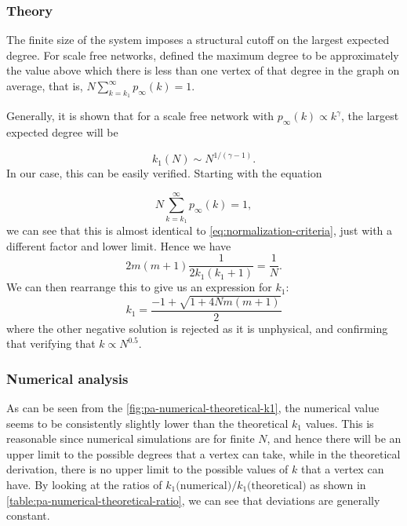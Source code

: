 \subsubsection{Theory}
The finite size of the system imposes a structural cutoff on the largest expected degree. For scale free networks, \citet{Aiello2001a} defined the maximum degree to be approximately the value above which there is less than one vertex of that degree in the graph on average, that is, $N \sum_{k = k_1}^\infty p_\infty(k) = 1$. 

Generally, it is shown \citep{Boguna2004} that for a scale free network with $p_{\infty}(k) \propto k^{\gamma}$, the largest expected degree will be

\begin{equation}
	k_1(N) \sim N^{1 / (\gamma -1)}.
	\label{eq:largest-expected-degree-research}
\end{equation}
In our case, this can be easily verified. Starting with the equation 

\begin{equation}
	N \sum_{k=k_1}^\infty p_{\infty}(k) = 1, 
	\label{eq:largest-expected-degree-criteria}
\end{equation}
we can see that this is almost identical to \autoref{eq:normalization-criteria}, just with a different factor and lower limit. Hence we have 
\begin{equation}
	2m(m+1) \frac{1}{2k_1(k_1+1)} = \frac{1}{N}.
	\label{eq:largest-expected-degree-derivation}
\end{equation}
We can then rearrange this to give us an expression for $k_1$:
\begin{equation}
	k_1 = \frac{-1 + \sqrt{1 + 4Nm(m+1)}}{2}
	\label{eq:pa-k1-expression}
\end{equation}
where the other negative solution is rejected as it is unphysical, and confirming that verifying that $k \propto N^{0.5}$. 

\subsubsection{Numerical analysis}\label{subsection:pa-numerical-largest-degree}

As can be seen from the \autoref{fig:pa-numerical-theoretical-k1}, the numerical value seems to be consistently slightly lower than the theoretical $k_1$ values. This is reasonable since numerical simulations are for finite $N$, and hence there will be an upper limit to the possible degrees that a vertex can take, while in the theoretical derivation, there is no upper limit to the possible values of $k$ that a vertex can have. By looking at the ratios of $ k_1 \text{(numerical)} / k_1 \text{(theoretical)} $ as shown in \autoref{table:pa-numerical-theoretical-ratio}, we can see that deviations are generally constant. 

